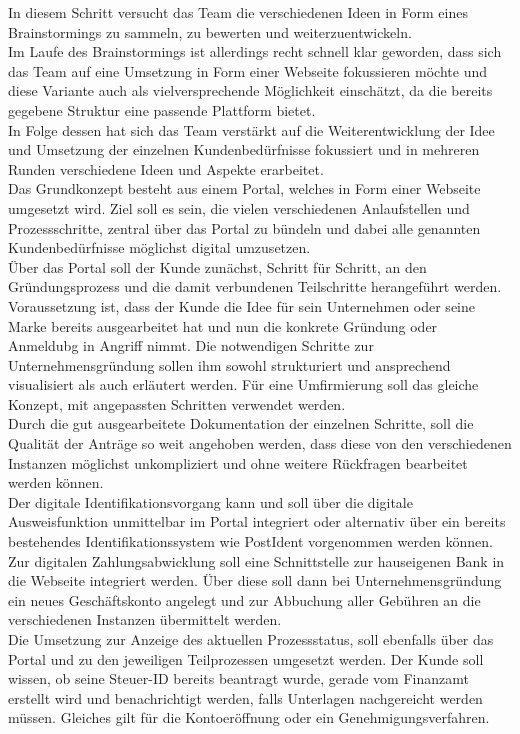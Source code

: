 In diesem Schritt versucht das Team die verschiedenen Ideen in Form eines Brainstormings zu sammeln, zu bewerten und weiterzuentwickeln.\\
Im Laufe des Brainstormings ist allerdings recht schnell klar geworden, dass sich das Team auf eine Umsetzung in Form einer Webseite fokussieren möchte und diese Variante auch als vielversprechende Möglichkeit einschätzt, da die bereits gegebene Struktur eine passende Plattform bietet.\\
In Folge dessen hat sich das Team verstärkt auf die Weiterentwicklung der Idee und Umsetzung der einzelnen Kundenbedürfnisse fokussiert und in mehreren Runden verschiedene Ideen und Aspekte erarbeitet.\\
Das Grundkonzept besteht aus einem Portal, welches in Form einer Webseite umgesetzt wird. Ziel soll es sein, die vielen verschiedenen Anlaufstellen und Prozessschritte, zentral über das Portal zu bündeln und dabei alle genannten Kundenbedürfnisse möglichst digital umzusetzen.\\
Über das Portal soll der Kunde zunächst, Schritt für Schritt, an den Gründungsprozess und die damit verbundenen Teilschritte herangeführt werden. Voraussetzung ist, dass der Kunde die Idee für sein Unternehmen oder seine Marke bereits ausgearbeitet hat und nun die konkrete Gründung oder Anmeldubg in Angriff nimmt. Die notwendigen Schritte zur Unternehmensgründung sollen ihm sowohl strukturiert und ansprechend visualisiert als auch erläutert werden. Für eine Umfirmierung soll das gleiche Konzept, mit angepassten Schritten verwendet werden.\\
Durch die gut ausgearbeitete Dokumentation der einzelnen Schritte, soll die Qualität der Anträge so weit angehoben werden, dass diese von den verschiedenen Instanzen möglichst unkompliziert und ohne weitere Rückfragen bearbeitet werden können.\\
Der digitale Identifikationsvorgang kann und soll über die digitale Ausweisfunktion unmittelbar im Portal integriert oder alternativ über ein bereits bestehendes Identifikationssystem wie PostIdent vorgenommen werden können. Zur digitalen Zahlungsabwicklung soll eine Schnittstelle zur hauseigenen Bank in die Webseite integriert werden. Über diese soll dann bei Unternehmensgründung ein neues Geschäftskonto angelegt und zur Abbuchung aller Gebühren an die verschiedenen Instanzen übermittelt werden.\\
Die Umsetzung zur Anzeige des aktuellen Prozessstatus, soll ebenfalls über das Portal und zu den jeweiligen Teilprozessen umgesetzt werden. Der Kunde soll wissen, ob seine Steuer-ID bereits beantragt wurde, gerade vom Finanzamt erstellt wird und benachrichtigt werden, falls Unterlagen nachgereicht werden müssen. Gleiches gilt für die Kontoeröffnung oder ein Genehmigungsverfahren.\\
